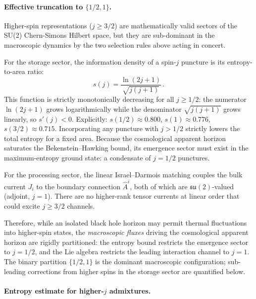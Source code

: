 \documentclass[aps,prd,twocolumn,10pt,superscriptaddress,nofootinbib]{revtex4-2}
\begin{document}
\paragraph{Effective truncation to $\{1/2, 1\}$.}

Higher-spin representations ($j \geq 3/2$) are mathematically
valid sectors of the SU(2) Chern-Simons Hilbert space, but they
are sub-dominant in the macroscopic dynamics by the two selection
rules above acting in concert.

For the storage sector, the information density of a spin-$j$
puncture is its entropy-to-area ratio:
\begin{equation}
s(j) = \frac{\ln(2j+1)}{\sqrt{j(j+1)}}\,.
\label{eq:info_density}
\end{equation}
This function is strictly monotonically decreasing for all
$j \geq 1/2$: the numerator $\ln(2j+1)$ grows logarithmically
while the denominator $\sqrt{j(j+1)}$ grows linearly, so
$s'(j) < 0$.  Explicitly: $s(1/2) \approx 0.800$,
$s(1) \approx 0.776$, $s(3/2) \approx 0.715$.  Incorporating any
puncture with $j > 1/2$ strictly lowers the total entropy for a
fixed area.  Because the cosmological apparent horizon saturates
the Bekenstein--Hawking bound, its emergence sector must exist in
the maximum-entropy ground state: a condensate of $j = 1/2$
punctures.

For the processing sector, the linear Israel--Darmois matching
couples the bulk current $J_i$ to the boundary connection
$\hat{A}^i$, both of which are $\mathfrak{su}(2)$-valued
(adjoint, $j = 1$).  There are no higher-rank tensor currents at
linear order that could excite $j \geq 3/2$ channels.

Therefore, while an isolated black hole horizon may permit thermal
fluctuations into higher-spin states, the \emph{macroscopic
fluxes} driving the cosmological apparent horizon are rigidly
partitioned: the entropy bound restricts the emergence sector to
$j = 1/2$, and the Lie algebra restricts the leading interaction
channel to $j = 1$.  The binary partition $\{1/2, 1\}$ is the
dominant macroscopic configuration; sub-leading corrections from
higher spins in the storage sector are quantified below.

\paragraph{Entropy estimate for higher-$j$ admixtures.}
\end{document}
